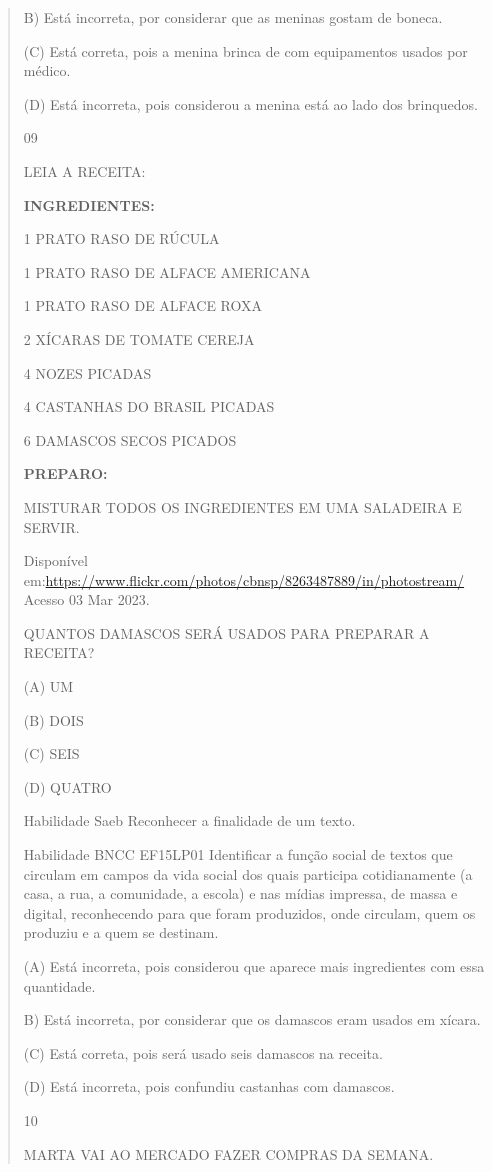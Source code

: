 {{{{\begin{verse}
{{\begin{escolha}
{{{{{B) Está incorreta, por considerar que as meninas gostam de boneca.

(C) Está correta, pois a menina brinca de com equipamentos usados por
médico.

(D) Está incorreta, pois considerou a menina está ao lado dos
brinquedos.

\num{09}

LEIA A RECEITA:

\textbf{INGREDIENTES:}

1 PRATO RASO DE RÚCULA

1 PRATO RASO DE ALFACE AMERICANA

1 PRATO RASO DE ALFACE ROXA

2 XÍCARAS DE TOMATE CEREJA

4 NOZES PICADAS

4 CASTANHAS DO BRASIL PICADAS

6 DAMASCOS SECOS PICADOS

\textbf{PREPARO:}

MISTURAR TODOS OS INGREDIENTES EM UMA SALADEIRA E SERVIR.

Disponível
em:\url{https://www.flickr.com/photos/cbnsp/8263487889/in/photostream/}
Acesso 03 Mar 2023.

QUANTOS DAMASCOS SERÁ USADOS PARA PREPARAR A RECEITA?

(A) UM

(B) DOIS

(C) SEIS

(D) QUATRO

Habilidade Saeb Reconhecer a finalidade de um texto.

Habilidade BNCC EF15LP01 Identificar a função social de textos que
circulam em campos da vida social dos quais participa cotidianamente (a
casa, a rua, a comunidade, a escola) e nas mídias impressa, de massa e
digital, reconhecendo para que foram produzidos, onde circulam, quem os
produziu e a quem se destinam.

(A) Está incorreta, pois considerou que aparece mais ingredientes com
essa quantidade.

B) Está incorreta, por considerar que os damascos eram usados em xícara.

(C) Está correta, pois será usado seis damascos na receita.

(D) Está incorreta, pois confundiu castanhas com damascos.

\num{10}

MARTA VAI AO MERCADO FAZER COMPRAS DA SEMANA.

}}}}}
\end{escolha}}}
\end{verse}}}}}
